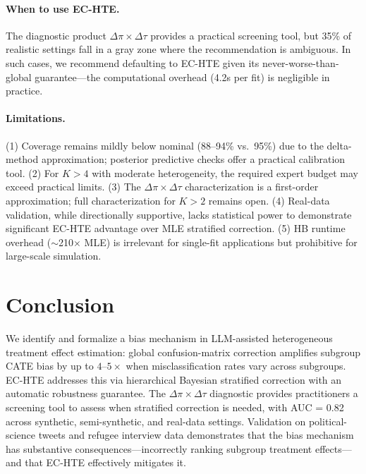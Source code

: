\documentclass[11pt,a4paper]{article}
\begin{document}
\paragraph{When to use EC-HTE.}
The diagnostic product $\Delta\pi \times \Delta\tau$ provides a practical screening tool, but 35\% of realistic settings fall in a gray zone where the recommendation is ambiguous.
In such cases, we recommend defaulting to EC-HTE given its never-worse-than-global guarantee---the computational overhead (4.2s per fit) is negligible in practice.

\paragraph{Limitations.}
(1) Coverage remains mildly below nominal (88--94\% vs.\ 95\%) due to the delta-method approximation; posterior predictive checks offer a practical calibration tool.
(2) For $K > 4$ with moderate heterogeneity, the required expert budget may exceed practical limits.
(3) The $\Delta\pi \times \Delta\tau$ characterization is a first-order approximation; full characterization for $K > 2$ remains open.
(4) Real-data validation, while directionally supportive, lacks statistical power to demonstrate significant EC-HTE advantage over MLE stratified correction.
(5) HB runtime overhead ($\sim$210$\times$ MLE) is irrelevant for single-fit applications but prohibitive for large-scale simulation.

\section{Conclusion}

We identify and formalize a bias mechanism in LLM-assisted heterogeneous treatment effect estimation: global confusion-matrix correction amplifies subgroup CATE bias by up to $4\text{--}5\times$ when misclassification rates vary across subgroups.
EC-HTE addresses this via hierarchical Bayesian stratified correction with an automatic robustness guarantee.
The $\Delta\pi \times \Delta\tau$ diagnostic provides practitioners a screening tool to assess when stratified correction is needed, with AUC = 0.82 across synthetic, semi-synthetic, and real-data settings.
Validation on political-science tweets and refugee interview data demonstrates that the bias mechanism has substantive consequences---incorrectly ranking subgroup treatment effects---and that EC-HTE effectively mitigates it.
\end{document}
